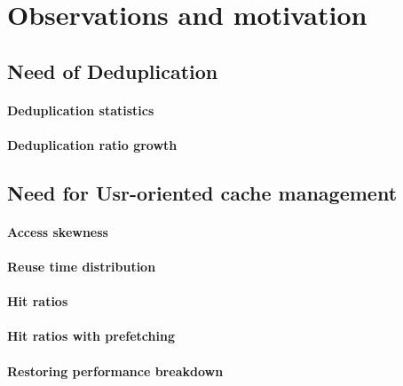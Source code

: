 \section{Observations and motivation} %
\label{sec:background}

\subsection{Need of Deduplication}

\paragraph{Deduplication statistics} %

\paragraph{Deduplication ratio growth} %

\subsection{Need for Usr-oriented cache management}

\paragraph{Access skewness}

\paragraph{Reuse time distribution}

\paragraph{Hit ratios}

\paragraph{Hit ratios with prefetching}


\paragraph{Restoring performance breakdown}